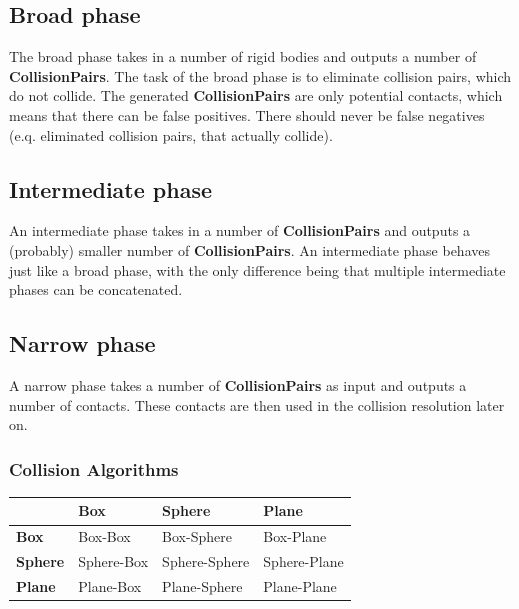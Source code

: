 \documentclass[12p, paper=a4, leqno, colorinlistoftodos]{article}
\begin{document}
		\subsection{Broad phase}
		The broad phase takes in a number of rigid bodies and outputs a number of \textbf{CollisionPairs}. The task of the broad phase is to eliminate collision pairs, which do not collide. The generated \textbf{CollisionPairs} are only potential contacts, which means that there can be false positives. There should never be false negatives (e.q. eliminated collision pairs, that actually collide).
		
		
		\subsection{Intermediate phase}
		An intermediate phase takes in a number of \textbf{CollisionPairs} and outputs a (probably) smaller number of \textbf{CollisionPairs}. An intermediate phase behaves just like a broad phase, with the only difference being that multiple intermediate phases can be concatenated.
		
		\subsection{Narrow phase}
		A narrow phase takes a number of \textbf{CollisionPairs} as input and outputs a number of contacts. These contacts are then used in the collision resolution later on.
		
			\subsubsection{Collision Algorithms}
			\begin{table}[ht]
				\begin{tabular}{|l || l | l | l |}
					\hline
					& \textbf{Box} & \textbf{Sphere} & \textbf{Plane}\\
					\hline
					\hline
					\textbf{Box} & Box-Box & Box-Sphere & Box-Plane\\
					\hline
					\textbf{Sphere} & Sphere-Box & Sphere-Sphere & Sphere-Plane\\
					\hline
					\textbf{Plane}& Plane-Box & Plane-Sphere & Plane-Plane\\
					\hline
				\end{tabular}
			\end{table}
		
\end{document}
